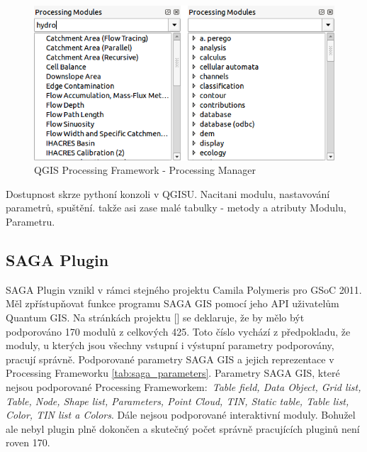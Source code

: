 \begin{figure}
	\centering
	\includegraphics[scale=0.5]{pictures/pf/processing_manager_small}
	\caption{QGIS Processing Framework - Processing Manager}
  	\label{pf:pm}
\end{figure}

{\color{red}Dostupnost skrze pythoní konzoli v QGISU. Nacitani modulu, nastavování parametrů, spuštění. takže asi zase malé tabulky - metody a atributy Modulu, Parametru.}


\subsection{SAGA Plugin}
SAGA Plugin vznikl v rámci stejného projektu Camila Polymeris pro GSoC 2011. Měl zpřístupňovat funkce programu SAGA GIS pomocí jeho API uživatelům Quantum GIS. Na stránkách projektu [\cite{pf:supportedModules}] se deklaruje, že by mělo být podporováno 170 modulů z celkových 425. Toto číslo vychází z předpokladu, že moduly, u kterých jsou všechny vstupní i výstupní parametry podporovány, pracují správně. Podporované parametry SAGA GIS a jejich reprezentace v Processing Frameworku \ref{tab:saga_parameters}. Parametry SAGA GIS, které nejsou podporované Processing Frameworkem$:$ \textit{Table field, Data Object, Grid list, Table, Node, Shape list, Parameters, Point Cloud, TIN, Static table, Table list, Color, TIN list a Colors}. Dále nejsou podporované interaktivní moduly. Bohužel ale nebyl plugin plně dokončen a skutečný počet správně pracujících pluginů není roven 170. \\

